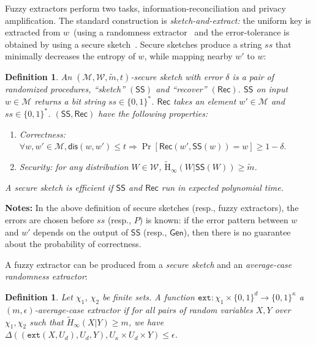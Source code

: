 \documentclass[11pt]{article}
\newcommand{\class}[1]{{\ensuremath{\mathsf{#1}}}}
\newcommand{\gen}{\ensuremath{\class{Gen}}\xspace}
\newcommand{\sketch}{\ensuremath{\class{SS}}\xspace}
\newcommand{\rec}{\ensuremath{\class{Rec}}\xspace}
\newcommand{\dis}{\ensuremath{\mathsf{dis}}}
\newcommand{\Hav}{\tilde{\mathrm{H}}_\infty}
\newcommand{\ext}{\ensuremath{\mathtt{ext}}}
\newtheorem{definition}[theorem]{Definition}
\begin{document}
\noindent
Fuzzy extractors perform two tasks, information-reconciliation and privacy amplification.  The standard construction is \emph{sketch-and-extract:} the uniform key is extracted from $w$~(using a randomness extractor~\cite{nisan1993randomness} and the error-tolerance is obtained by using a secure sketch~\cite[Lemma 4.1]{DBLP:journals/siamcomp/DodisORS08}.  Secure sketches produce a string $ss$ that minimally decreases the entropy of $w$, while mapping nearby $w'$ to $w$:
\begin{definition}
\label{def:secure sketch}
An $(\mathcal{M},\mathcal{W}, \tilde{m}, t)$-\emph{secure sketch} with error $\delta$ is a pair of randomized procedures, ``sketch'' $(\sketch)$ and ``recover'' $(\rec)$.  \sketch on input $w\in\mathcal{M}$ returns a bit string $ss\in\{0,1\}^*$.  \rec takes an element $w'\in\mathcal{M}$ and $ss\in\{0,1\}^*$.  $(\sketch, \rec)$ have the following properties:
\begin{enumerate}
\item \emph{Correctness}: $ \forall w, w'\in\mathcal{M}, \dis(w,w')\leq t \Rightarrow \Pr[\rec(w',\sketch(w))=w]\geq 1-\delta.$
\item \emph{Security}: for any distribution $W\in\mathcal{W}$, $\Hav(W|\sketch(W))\geq \tilde{m}$.
\end{enumerate}
A secure sketch is \emph{efficient} if \sketch and \rec run in expected polynomial time. 
\end{definition}

\noindent \textbf{Notes:} In the above definition of secure sketches (resp., fuzzy extractors), the errors are chosen before $ss$ (resp., $P$) is known: if the error pattern between $w$ and $w'$ depends on the output of $\sketch$ (resp., $\gen$), then there is no guarantee about the probability of correctness.  

A fuzzy extractor can be produced from a \emph{secure sketch} and an \emph{average-case randomness extractor}:

\begin{definition}
Let $\chi_1$, $\chi_2$ be finite sets.
A function $\ext: \chi_1\times \{0,1\}^d \rightarrow \{0,1\}^\kappa$ a \emph{$(m, \epsilon)$-average-case extractor} if for all pairs
of random variables $X, Y$ over $\chi_1, \chi_2$ such that
$\tilde{H}_\infty(X|Y) \ge m$, we have $\Delta((\ext(X, U_d), U_d, Y), U_\kappa\times
U_d \times Y) \le \epsilon$.
\end{definition}
\end{document}
